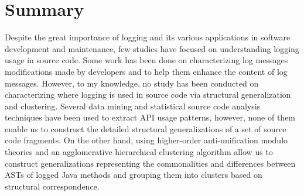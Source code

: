 \section{Summary}  \label{back-summary}

Despite the great importance of logging and its various applications in software development and maintenance, few studies have focused on understanding logging usage in source code.
Some work has been done on characterizing log messages modifications made by developers and to help them enhance the content of log messages. However, to my knowledge, no study has been conducted on characterizing where logging is used in source code via structural generalization and clustering. Several data mining and statistical source code analysis techniques have been used to extract API usage patterns, however, none of them enable us to construct the detailed structural generalizations of a set of source code fragments. On the other hand, using higher-order anti-unification modulo theories and an agglomerative hierarchical clustering algorithm allow us to construct generalizations representing the commonalities and differences between ASTs of logged Java methods and grouping them into clusters based on structural correspondence.

